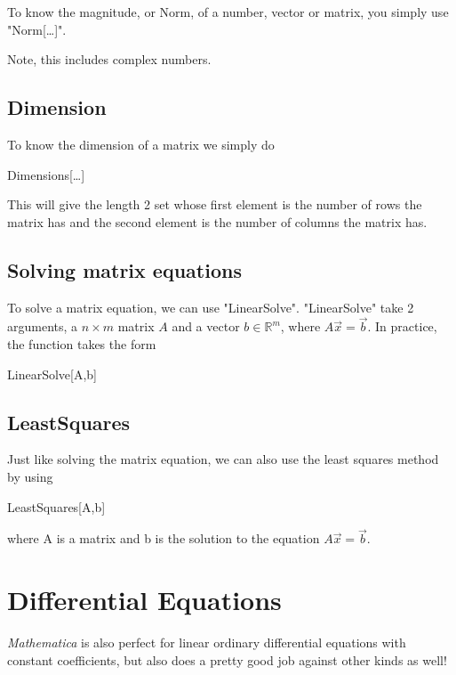 \documentclass[11pt,letterpaper,twoside,titlepage]{report}
\newcommand{\Mathematica}{\textit{Mathematica} }
\begin{document}
				To know the magnitude, or Norm, of a number, vector or matrix, you simply use "Norm[\dots]".
						
				Note, this includes complex numbers.
						
			\section{Dimension}
						
				To know the dimension of a matrix we simply do 
						
				\begin{center} Dimensions[\dots] \end{center}
						
				This will give the length 2 set whose first element is the number of rows the matrix has and the second element is the number of columns the matrix has.
						
			\section{Solving matrix equations}
						
				To solve a matrix equation, we can use "LinearSolve".  "LinearSolve" take 2 arguments, a $n \times m$ matrix $A$ and a vector $ b \in \mathbb{R}^m $, where $ A \vec{x} = \vec{b} $.  In practice, the function takes the form
						
				\begin{center} LinearSolve[A,b] \end{center}
						
			\section{LeastSquares}
						
				Just like solving the matrix equation, we can also use the least squares method by using 
						
				\begin{center} LeastSquares[A,b] \end{center} 
						
				where A is a matrix and b is the solution to the equation $A \vec{x} = \vec{b} $.
				
		\chapter{Differential Equations}
			
			\Mathematica is also perfect for linear ordinary differential equations with constant coefficients, but also does a pretty good job against other kinds as well!
				
\end{document}
